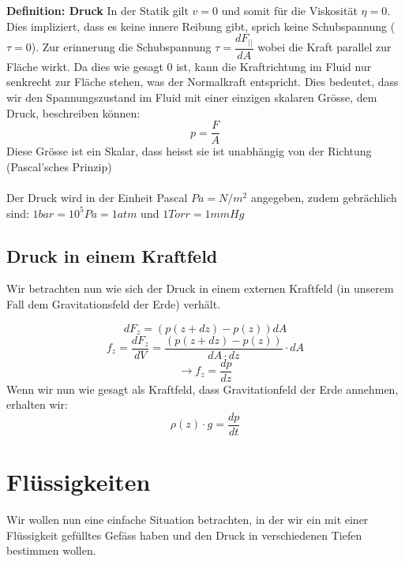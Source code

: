 \documentclass[12pt]{article}
\begin{document}
 \textbf{Definition: Druck}
 In der Statik gilt $v=0$ und somit für die Viskosität $\eta = 0$. Dies impliziert, dass es keine innere Reibung gibt, sprich keine Schubspannung ($\tau = 0$). Zur erinnerung die Schubspannung $\tau = \dfrac{dF_{||}}{dA} $ wobei die Kraft parallel zur Fläche wirkt. Da dies wie gesagt $0$ ist, kann die Kraftrichtung im Fluid nur senkrecht zur Fläche stehen, was der Normalkraft entspricht. Dies bedeutet, dass wir den Spannungszustand im Fluid mit einer einzigen skalaren Grösse, dem Druck, beschreiben können:
 \begin{equation}
 p = \dfrac{F}{A}
 \end{equation}
 Diese Grösse ist ein Skalar, dass heisst sie ist unabhängig von der Richtung (Pascal'sches Prinzip)\\
 \\
 Der Druck wird in der Einheit Pascal $Pa = N/m^2$ angegeben, zudem gebrächlich sind: $1bar = 10^5Pa = 1atm$ und $1Torr = 1mm Hg$
 
 \subsection{Druck in einem Kraftfeld}
 Wir betrachten nun wie sich der Druck in einem externen Kraftfeld (in unserem Fall dem Gravitationsfeld der Erde) verhält.

\begin{figure}[H]
  \label{fig:1teil}
\end{figure} 

\begin{equation}
dF_z = \left(p(z+dz)-p(z) \right) dA
\end{equation}
\begin{equation}
f_z = \dfrac{dF_z}{dV} = \dfrac{\left(p(z+dz)-p(z) \right)}{dA \cdot dz} \cdot dA
\end{equation}
\begin{equation}
\rightarrow f_z = \dfrac{dp}{dz}
\end{equation}
Wenn wir nun wie gesagt als Kraftfeld, dass Gravitationfeld der Erde annehmen, erhalten wir:
\begin{equation}
\rho(z) \cdot g = \dfrac{dp}{dt}
\end{equation}

\section{Flüssigkeiten}
 Wir wollen nun eine einfache Situation betrachten, in der wir ein mit einer Flüssigkeit gefülltes Gefäss haben und den Druck in verschiedenen Tiefen bestimmen wollen.
 
\end{document}
